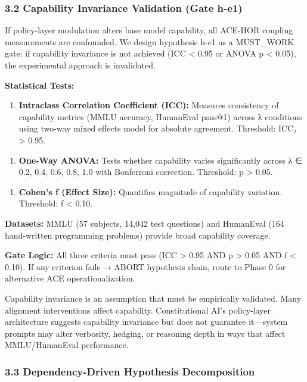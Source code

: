 \subsubsection{3.2 Capability Invariance Validation (Gate h-e1)}

If policy-layer modulation alters base model capability, all ACE-HOR coupling measurements are confounded. We design hypothesis h-e1 as a MUST_WORK gate: if capability invariance is not achieved (ICC < 0.95 or ANOVA p < 0.05), the experimental approach is invalidated.

\textbf{Statistical Tests:}

\begin{enumerate}
\item \textbf{Intraclass Correlation Coefficient (ICC):} Measures consistency of capability metrics (MMLU accuracy, HumanEval pass@1) across λ conditions using two-way mixed effects model for absolute agreement. Threshold: ICC₂ > 0.95.
\end{enumerate}

\begin{enumerate}
\item \textbf{One-Way ANOVA:} Tests whether capability varies significantly across λ ∈ {0.2, 0.4, 0.6, 0.8, 1.0} with Bonferroni correction. Threshold: p > 0.05.
\end{enumerate}

\begin{enumerate}
\item \textbf{Cohen's f (Effect Size):} Quantifies magnitude of capability variation. Threshold: f < 0.10.
\end{enumerate}

\textbf{Datasets:} MMLU (57 subjects, 14,042 test questions) and HumanEval (164 hand-written programming problems) provide broad capability coverage.

\textbf{Gate Logic:} All three criteria must pass (ICC > 0.95 AND p > 0.05 AND f < 0.10). If any criterion fails → ABORT hypothesis chain, route to Phase 0 for alternative ACE operationalization.

Capability invariance is an assumption that must be empirically validated. Many alignment interventions affect capability. Constitutional AI's policy-layer architecture suggests capability invariance but does not guarantee it—system prompts may alter verbosity, hedging, or reasoning depth in ways that affect MMLU/HumanEval performance.

\subsubsection{3.3 Dependency-Driven Hypothesis Decomposition}

